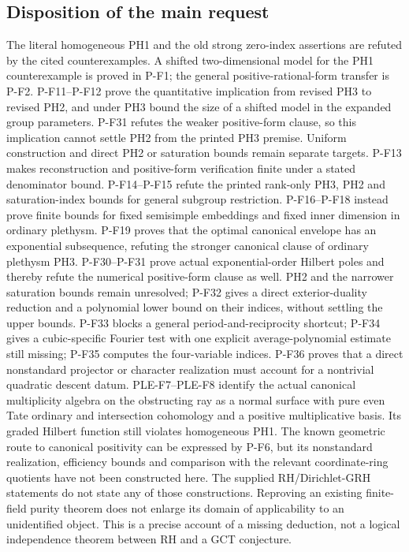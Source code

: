 \documentclass[11pt,a4paper]{article}
\begin{document}
\subsection{Disposition of the main request}
The literal homogeneous PH1 and the old strong zero-index assertions
are refuted by the cited counterexamples. A shifted two-dimensional
model for the PH1 counterexample is proved in P-F1; the general
positive-rational-form transfer is P-F2. P-F11--P-F12 prove the
quantitative implication from revised PH3 to revised PH2, and under
PH3 bound the size of a shifted model in the expanded group parameters.
P-F31 refutes the weaker positive-form clause, so this implication
cannot settle PH2 from the printed PH3 premise. Uniform construction
and direct PH2 or saturation bounds remain separate targets. P-F13 makes reconstruction and positive-form verification
finite under a stated denominator bound. P-F14--P-F15 refute the
printed rank-only PH3, PH2 and saturation-index bounds for general
subgroup restriction. P-F16--P-F18 instead prove finite bounds for
fixed semisimple embeddings and fixed inner dimension in ordinary
plethysm. P-F19 proves that the optimal canonical envelope has an
exponential subsequence, refuting the stronger canonical clause of
ordinary plethysm PH3. P-F30--P-F31 prove actual exponential-order
Hilbert poles and thereby refute the numerical positive-form clause
as well. PH2 and the narrower saturation bounds remain unresolved;
P-F32 gives a direct exterior-duality reduction and a polynomial
lower bound on their indices, without settling the upper bounds.
P-F33 blocks a general period-and-reciprocity shortcut; P-F34 gives
a cubic-specific Fourier test with one explicit average-polynomial
estimate still missing; P-F35 computes the four-variable indices.
P-F36 proves that a direct nonstandard projector or character
realization must account for a nontrivial quadratic descent datum.
PLE-F7--PLE-F8 identify the actual canonical multiplicity algebra on
the obstructing ray as a normal surface with pure even Tate ordinary
and intersection cohomology and a positive multiplicative basis.
Its graded Hilbert function still violates homogeneous PH1.
The known geometric route to
canonical positivity can be expressed by P-F6, but its nonstandard
realization, efficiency bounds and comparison with the relevant
coordinate-ring quotients have not been constructed here.
The supplied RH/Dirichlet-GRH statements do not state any of those
constructions. Reproving an existing finite-field purity theorem does
not enlarge its domain of applicability to an unidentified object.
This is a precise account of a missing deduction, not a logical
independence theorem between RH and a GCT conjecture.
\end{document}
